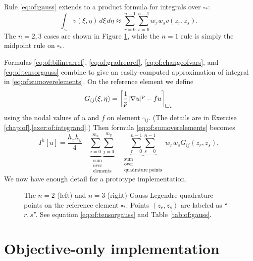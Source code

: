 Rule \eqref{eq:of:gauss} extends to a product formula for integrals over $\square_\ast$:
\begin{equation}
\int_{\square_\ast} v(\xi,\eta) \,d\xi\,d\eta \approx \sum_{r=0}^{n-1} \sum_{s=0}^{n-1} w_r w_s v(z_r,z_s).  \label{eq:of:tensorgauss}
\end{equation}
The $n=2,3$ cases are shown in Figure \ref{fig:of:gausstwod}, while the $n=1$ rule is simply the midpoint rule on $\square_\ast$.

Formulas \eqref{eq:of:bilinearref}, \eqref{eq:of:gradrepref}, \eqref{eq:of:changeofvars}, and \eqref{eq:of:tensorgauss} combine to give an easily-computed approximation of integral in \eqref{eq:of:sumoverelements}.  On the reference element we define
\begin{equation}
G_{ij}(\xi,\eta) = \left[\frac{1}{p} |\nabla u|^p - fu\right]_{\square_\ast} \label{eq:of:integrandheuristic}
\end{equation}
using the nodal values of $u$ and $f$ on element $\square_{ij}$.  (The details are in Exercise \ref{chap:of}.\ref{exer:of:integrand}.)  Then formula \eqref{eq:of:sumoverelements} becomes
\begin{equation}
I^h[u] = \frac{h_x h_y}{4} \quad \underbrace{\sum_{i=0}^{m_x} \sum_{j=0}^{m_y}}_{\begin{smallmatrix} \text{sum} \\ \text{over} \\ \text{elements} \end{smallmatrix}} \quad \underbrace{\sum_{r=0}^{n-1} \sum_{s=0}^{n-1}}_{\begin{smallmatrix} \text{sum} \\ \text{over} \\ \text{quadrature points} \end{smallmatrix}} \, w_r w_s G_{ij}(z_r,z_s). \label{eq:of:quadraturesumoverelements}
\end{equation}
We now have enough detail for a prototype implementation.

\begin{figure}

\caption{The $n=2$ (left) and $n=3$ (right) Gauss-Legendre quadrature points on the reference element $\square_\ast$.  Points $(z_r,z_s)$ are labeled as ``$r,s$''.  See equation \eqref{eq:of:tensorgauss} and Table \ref{tab:of:gauss}.}
\label{fig:of:gausstwod}
\end{figure}


\section{Objective-only implementation}

